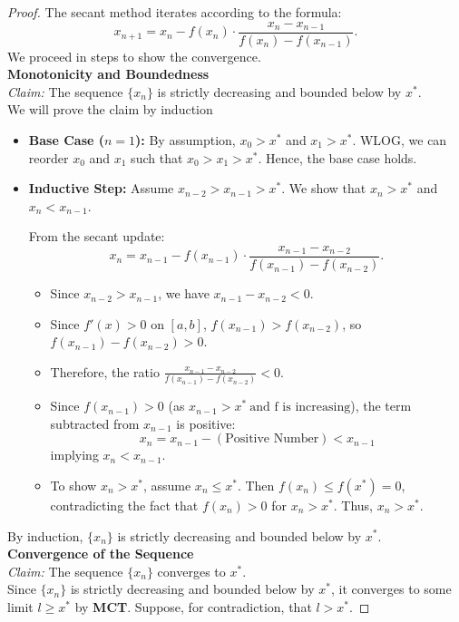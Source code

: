 \documentclass{article}
\begin{document}
\begin{proof}
    The secant method iterates according to the formula:
    \[
        x_{n+1} = x_n - f(x_n) \cdot \frac{x_n - x_{n-1}}{f(x_n) - f(x_{n-1})}.
    \]
    We proceed in steps to show the convergence.
    \\
    \textbf{Monotonicity and Boundedness}
    \\
    \textit{Claim: } The sequence \( \{x_n\} \) is strictly decreasing and bounded below by \( x^\ast \).
    \\
    We will prove the claim by induction
    \begin{itemize}
        \item \textbf{Base Case (\( n = 1 \)):} By assumption, \( x_0 > x^\ast \) and \( x_1 > x^\ast \). WLOG, we can reorder \( x_0 \) and \( x_1 \) such that \( x_0 > x_1 > x^\ast \). Hence, the base case holds.
    
        \item \textbf{Inductive Step:} Assume \( x_{n-2} > x_{n-1} > x^\ast \). We show that \( x_n > x^\ast \) and \( x_n < x_{n-1} \).
    
        From the secant update:
        \[
        x_n = x_{n-1} - f(x_{n-1}) \cdot \frac{x_{n-1} - x_{n-2}}{f(x_{n-1}) - f(x_{n-2})}.
        \]
        \begin{itemize}
            \item Since \( x_{n-2} > x_{n-1} \), we have \( x_{n-1} - x_{n-2} < 0 \).
            \item Since \( f'(x) > 0 \) on \([a, b]\), \( f(x_{n-1}) > f(x_{n-2}) \), so \( f(x_{n-1}) - f(x_{n-2}) > 0 \).
            \item Therefore, the ratio \( \frac{x_{n-1} - x_{n-2}}{f(x_{n-1}) - f(x_{n-2})} < 0 \).
            \item Since \( f(x_{n-1}) > 0 \) (as \( x_{n-1} > x^\ast \ \text{and f is increasing} \)), the term subtracted from \( x_{n-1} \) is positive:
            \[ x_n = x_{n-1} - (\text{Positive Number}) < x_{n-1} \]
            implying \( x_n < x_{n-1} \).
            \item To show \( x_n > x^\ast \), assume \( x_n \leq x^\ast \). Then \( f(x_n) \leq f(x^\ast) = 0 \), contradicting the fact that \( f(x_n) > 0 \) for \( x_n > x^\ast \). Thus, \( x_n > x^\ast \).
        \end{itemize}
    \end{itemize}
    By induction, \( \{x_n\} \) is strictly decreasing and bounded below by \( x^\ast \).
    \\
    \textbf{Convergence of the Sequence}
    \\
    \textit{Claim: } The sequence \( \{x_n\} \) converges to \( x^\ast \).
    \\
    Since \( \{x_n\} \) is strictly decreasing and bounded below by \( x^\ast \), it converges to some limit \( l \geq x^\ast \) by \textbf{MCT}. Suppose, for contradiction, that \( l > x^\ast \).
    

\end{proof}
\end{document}
